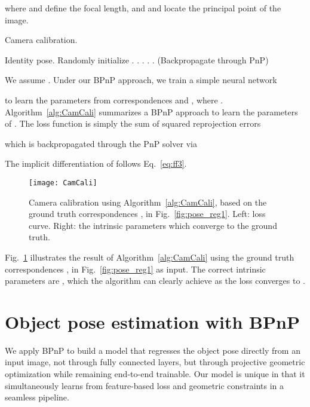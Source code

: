 \documentclass[10pt,twocolumn,letterpaper]{article}
\begin{document}
where  and  define the focal length, and  and  locate the principal point of the image.

\begin{algorithm}[t]
\centering
\caption{Camera calibration.}
\label{alg:CamCali}
\begin{algorithmic}[1]
\STATE  Identity pose.
\STATE Randomly initialize 
\STATE .
\STATE .
\STATE .
\STATE .
\STATE . \quad (Backpropagate through PnP) 
\ENDWHILE
\end{algorithmic}
\end{algorithm}

We assume . Under our BPnP approach, we train a simple neural network

to learn the parameters from correspondences  and , where . Algorithm~\ref{alg:CamCali} summarizes a BPnP approach to learn the parameters  of . The loss function is simply the sum of squared reprojection errors

which is backpropagated through the PnP solver via

The implicit differentiation of  follows Eq.~\eqref{eq:ff3}.


\begin{figure}[t]
    \centering
    \texttt{[image: CamCali]}
    \caption{Camera calibration using Algorithm~\ref{alg:CamCali}, based on the ground truth correspondences ,  in Fig.~\ref{fig:pose_reg1}. Left: loss curve. Right: the intrinsic parameters which converge to the ground truth. }
    \label{fig:CamCali}
\end{figure}

Fig.~\ref{fig:CamCali} illustrates the result of Algorithm~\ref{alg:CamCali} using the ground truth correspondences ,  in Fig.~\ref{fig:pose_reg1} as input. The correct intrinsic parameters are , which the algorithm can clearly achieve as the loss converges to . 










\section{Object pose estimation with BPnP}\label{sec:objectpose}




We apply BPnP to build a model that regresses the object pose directly from an input image, not through fully connected layers, but through projective geometric optimization while remaining end-to-end trainable. Our model is unique in that it simultaneously learns from feature-based loss and geometric constraints in a seamless pipeline. 
\end{document}

